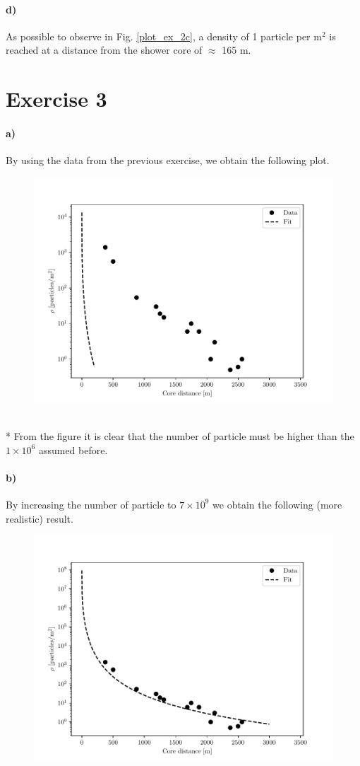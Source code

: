 \documentclass{article}
\begin{document}
\paragraph{d)}
As possible to observe in Fig. \ref{plot_ex_2c}, a density of 1 particle per m$^2$ is reached at a distance from the shower core of $\approx$ 165 m.

\section*{Exercise 3}
\paragraph{a)}
By using the data from the previous exercise, we obtain the following plot. 
\pagebreak
\begin{figure}[h]
\centering
\includegraphics[height=6 cm, width= 8 cm]{plot_ex_3a_1.pdf}
\end{figure}
\\* From the figure it is clear that the number of particle must be higher than the $1\times 10^6$ assumed before.

\paragraph{b)}
By increasing the number of particle to $7\times 10^9$ we obtain the following (more realistic) result. 
\begin{figure}[h]
\centering
\includegraphics[height=6 cm, width= 8 cm]{plot_ex_3a_2.pdf}
\end{figure}
\end{document}

